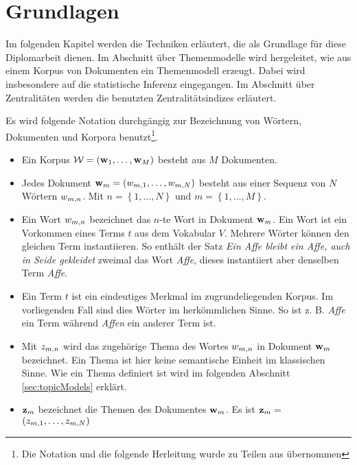 \chapter{Grundlagen}
\label{chap:basics}

Im folgenden Kapitel werden die Techniken erläutert, die als Grundlage für diese Diplomarbeit dienen. Im Abschnitt über Themenmodelle wird hergeleitet, wie aus einem Korpus von Dokumenten ein Themenmodell erzeugt. Dabei wird insbesondere auf die statistische Inferenz eingegangen. Im Abschnitt über Zentralitäten werden die benutzten Zentralitätsindizes erläutert.

Es wird folgende Notation durchgängig zur Bezeichnung von Wörtern, Dokumenten und Korpora benutzt\footnote{Die Notation und die folgende Herleitung wurde zu Teilen aus \citep{parameterEstimation} übernommen}.
\begin{itemize}
  \item Ein Korpus $\mathcal{W}=(\mathbf{w}_1,\ldots,\mathbf{w}_M)$ besteht aus $M$ Dokumenten. 
  \item Jedes Dokument $\mathbf{w}_m=(w_{m,1},\ldots,w_{m,N})$ besteht aus einer Sequenz von $N$ Wörtern $w_{m,n}$. Mit $n = \left\lbrace 1,\ldots,N\right\rbrace$ und $m = \left\lbrace 1,\ldots,M\right\rbrace$. 
  \item Ein Wort $w_{m,n}$ bezeichnet das $n$-te Wort in Dokument $\mathbf{w}_m$. Ein Wort ist ein Vorkommen eines Terms $t$ aus dem Vokabular $V$. Mehrere Wörter können den gleichen Term instantiieren. So enthält der Satz \textit{Ein Affe bleibt ein Affe, auch in Seide gekleidet} zweimal das Wort \textit{Affe}, dieses instantiiert aber denselben Term \textit{Affe}. 
  \item Ein Term $t$ ist ein eindeutiges Merkmal im zugrundeliegenden Korpus. Im vorliegenden Fall sind dies Wörter im herkömmlichen Sinne. So ist z. B. \textit{Affe} ein Term während \textit{Affen} ein anderer Term ist. 
  \item Mit $z_{m,n}$ wird das zugehörige Thema des Wortes $w_{m,n}$ in Dokument $\mathbf{w}_m$ bezeichnet. Ein Thema ist hier keine semantische Einheit im klassischen Sinne. Wie ein Thema definiert ist wird im folgenden Abschnitt \ref{sec:topicModels} erklärt.
  \item $\mathbf{z}_m$ bezeichnet die Themen des Dokumentes $\mathbf{w}_m$. Es ist $\mathbf{z}_m =$\\ $\left(z_{m,1},\ldots,z_{m,N}\right)$
\end{itemize}





